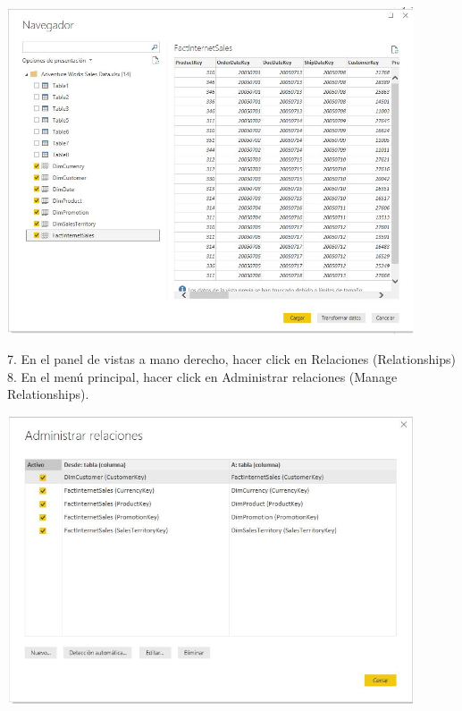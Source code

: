 \begin{center}
\includegraphics[width=12cm]{./Imagenes/img1-6} 
\end{center}
    
\begin{itemize}
    7.  En el panel de vistas a mano derecho, hacer click en Relaciones (Relationships)\\
    8.  En el menú principal, hacer click en Administrar relaciones (Manage Relationships).\\

\end{itemize} 


\begin{center}
\includegraphics[width=12cm]{./Imagenes/img7-8} 
\end{center}
    

